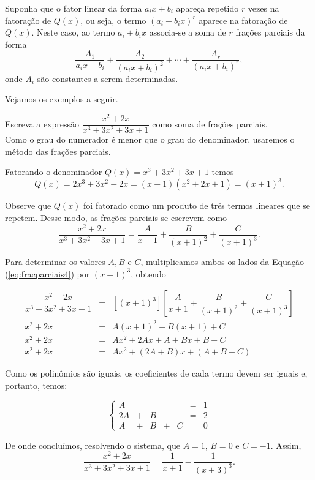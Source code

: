 Suponha que o fator linear da forma $a_i x + b_i$ apareça repetido $r$ vezes na fatoração de $Q(x)$, ou seja, o termo $(a_i + b_i x)^r$ aparece na fatoração de $Q(x)$. Neste caso, ao termo $a_i + b_i x$ associa-se a soma de $r$ frações parciais da forma
$$\dfrac{A_1}{a_i x+b_i} + \dfrac{A_2}{(a_i x+b_i)^2} + \cdots + \dfrac{A_r}{(a_i x+b_i)^r},$$
onde $A_i$ são constantes a serem determinadas.

Vejamos os exemplos a seguir.

\begin{exem}
    Escreva a expressão $\dfrac{x^2 + 2x}{x^3 + 3x^2 + 3x + 1}$ como soma de frações parciais. \\[10pt]

    Como o grau do numerador é menor que o grau do denominador, usaremos o método das frações parciais.

    Fatorando o denominador $Q(x) = x^3 + 3x^2 + 3x + 1$ temos $$Q(x) = 2x^3 + 3x^2 - 2x = (x+1)(x^2 + 2x +1) = (x+1)^3.$$

    Observe que $Q(x)$ foi fatorado como um produto de três termos lineares que se repetem. Desse modo, as frações parciais se escrevem como 
    \begin{equation}
    \label{eq:fracparciais4}
    \dfrac{x^2 + 2x}{x^3 + 3x^2 + 3x + 1} = \dfrac{A}{x+1} + \dfrac{B}{(x+1)^2} + \dfrac{C}{(x+1)^3}.
    \end{equation}

    Para determinar os valores $A, B$ e $C$, multiplicamos ambos os lados da Equação (\ref{eq:fracparciais4}) por $(x+1)^3$, obtendo

    \begin{eqnarray*}
    [(x+1)^3]\dfrac{x^2 + 2x}{x^3 + 3x^2 +3x +1} & = & [(x+1)^3] \left[\dfrac{A}{x+1} + \dfrac{B}{(x+1)^2}+\dfrac{C}{(x+1)^3}\right]\\[5pt]
    x^2 + 2x & =& A(x+1)^2 + B(x+1) + C \\[5pt]
    x^2 + 2x & =& Ax^2 + 2Ax + A + Bx + B + C\\[5pt]
    x^2 + 2x & = & Ax^2 + (2A + B)x + (A + B + C)
    \end{eqnarray*}

    Como os polinômios são iguais, os coeficientes de cada termo devem ser iguais e, portanto, temos:

    \begin{equation*}
    \left\{ \begin{array}{ccccccc} 
    A &  &  &  &  &=& 1 \\[5pt]
    2A & + & B &  & &=& 2\\[5pt]
    A & + & B & + & C &=& 0
    \end{array}
    \right.    
    \end{equation*}

    De onde concluímos, resolvendo o sistema, que $A = 1, \, B = 0$ e $C = -1$. Assim, $$\dfrac{x^2 + 2x}{x^3 + 3x^2 +3x + 1} = \dfrac{1}{x+1} - \dfrac{1}{(x+3)^3}.$$
 \end{exem}

